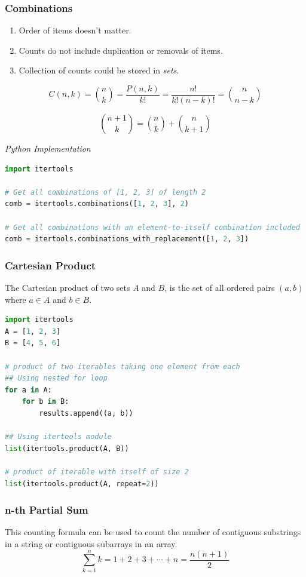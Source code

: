\documentclass{article}
\begin{document}
    \subsubsection{Combinations}
    \begin{enumerate}
        \item Order of items doesn't matter. 
        \item Counts do not include duplication or removals of items.
        \item Collection of counts could be stored in \emph{sets}.
    \end{enumerate}
    
    \[
       C(n, k) = \binom{n}{k} = \frac{P(n,k)}{k!} = \frac{n!}{k!(n-k)!} = \binom{n}{n-k}
    \]
    
    \[
        \binom{n+1}{k} = \binom{n}{k} + \binom{n}{k+1}
    \]

\vspace{8pt} \emph{Python Implementation}
\begin{lstlisting}[language=Python]
import itertools

# Get all combinations of [1, 2, 3] of length 2 
comb = itertools.combinations([1, 2, 3], 2)

# Get all combinations with an element-to-itself combination included 
comb = itertools.combinations_with_replacement([1, 2, 3])
\end{lstlisting}

    \subsubsection{Cartesian Product}
    The Cartesian product of two sets $A$ and $B$, is the set of all ordered pairs $(a, b)$ where $a \in A$ and $b \in B$.

\begin{lstlisting}[language=Python]
import itertools
A = [1, 2, 3]
B = [4, 5, 6]

# product of two iterables taking one element from each
## Using nested for loop
for a in A: 
    for b in B:
        results.append((a, b))

## Using itertools module
list(itertools.product(A, B))

# product of iterable with itself of size 2
list(itertools.product(A, repeat=2))
\end{lstlisting}

    \subsubsection{n-th Partial Sum}
    This counting formula can be used to count the number of contiguous substrings in a string or contiguous subarrays in an array.
    \[
        \sum_{k=1}^n k = 1 + 2 + 3 + \cdots + n = \frac{n(n+1)}{2} 
    \]
    
\end{document}
